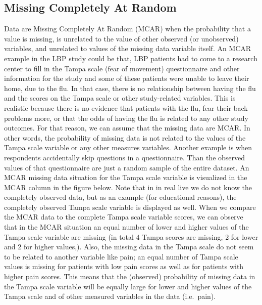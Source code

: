 \documentclass[]{book}
\begin{document}
\subsection{Missing Completely At
Random}\label{missing-completely-at-random}

Data are Missing Completely At Random (MCAR) when the probability that a
value is missing, is unrelated to the value of other observed (or
unobserved) variables, and unrelated to values of the missing data
variable itself. An MCAR example in the LBP study could be that, LBP
patients had to come to a research center to fill in the Tampa scale
(fear of movement) questionnaire and other information for the study and
some of these patients were unable to leave their home, due to the flu.
In that case, there is no relationship between having the flu and the
scores on the Tampa scale or other study-related variables. This is
realistic because there is no evidence that patients with the flu, fear
their back problems more, or that the odds of having the flu is related
to any other study outcomes. For that reason, we can assume that the
missing data are MCAR. In other words, the probability of missing data
is not related to the values of the Tampa scale variable or any other
measures variables. Another example is when respondents accidentally
skip questions in a questionnaire. Than the observed values of that
questionnaire are just a random sample of the entire dataset. An MCAR
missing data situation for the Tampa scale variable is visualized in the
MCAR column in the figure below. Note that in in real live we do not
know the completely observed data, but as an example (for educational
reasons), the completely observed Tampa scale variable is displayed as
well. When we compare the MCAR data to the complete Tampa scale variable
scores, we can observe that in the MCAR situation an equal number of
lower and higher values of the Tampa scale variable are missing (in
total 4 Tampa scores are missing, 2 for lower and 2 for higher values,).
Also, the missing data in the Tampa scale do not seem to be related to
another variable like pain; an equal number of Tampa scale values is
missing for patients with low pain scores as well as for patients with
higher pain scores. This means that the (observed) probability of
missing data in the Tampa scale variable will be equally large for lower
and higher values of the Tampa scale and of other measured variables in
the data (i.e.~pain).
\end{document}
